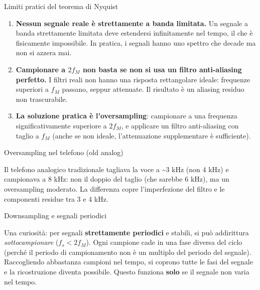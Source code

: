 \documentclass[
  italian,
  openany]{book}
\begin{document}
\begin{calloutwarning}{Limiti pratici del teorema di Nyquist}

\begin{enumerate}
\def\labelenumi{\arabic{enumi}.}
\item
  \textbf{Nessun segnale reale è strettamente a banda limitata.} Un
  segnale a banda strettamente limitata deve estendersi infinitamente
  nel tempo, il che è fisicamente impossibile. In pratica, i segnali
  hanno uno spettro che decade ma non si azzera mai.
\item
  \textbf{Campionare a \(2f_M\) non basta se non si usa un filtro
  anti-aliasing perfetto.} I filtri reali non hanno una risposta
  rettangolare ideale: frequenze superiori a \(f_M\) passano, seppur
  attenuate. Il risultato è un aliasing residuo non trascurabile.
\item
  \textbf{La soluzione pratica è l'oversampling}: campionare a una
  frequenza significativamente superiore a \(2f_M\), e applicare un
  filtro anti-aliasing con taglio a \(f_M\) (anche se non ideale,
  l'attenuazione supplementare è sufficiente).
\end{enumerate}

\end{calloutwarning}

\begin{callouttip}{Oversampling nel telefono (old analog)}

Il telefono analogico tradizionale tagliava la voce a \textasciitilde3
kHz (non 4 kHz) e campionava a 8 kHz: non il doppio del taglio (che
sarebbe 6 kHz), ma un oversampling moderato. La differenza copre
l'imperfezione del filtro e le componenti residue tra 3 e 4 kHz.

\end{callouttip}

\begin{calloutnote}{Downsampling e segnali periodici}

Una curiosità: per segnali \textbf{strettamente periodici} e stabili, si
può addirittura \emph{sottocampionare} (\(f_s < 2f_M\)). Ogni campione
cade in una fase diversa del ciclo (perché il periodo di campionamento
non è un multiplo del periodo del segnale). Raccogliendo abbastanza
campioni nel tempo, si coprono tutte le fasi del segnale e la
ricostruzione diventa possibile. Questo funziona \textbf{solo} se il
segnale non varia nel tempo.

\end{calloutnote}
\end{document}
